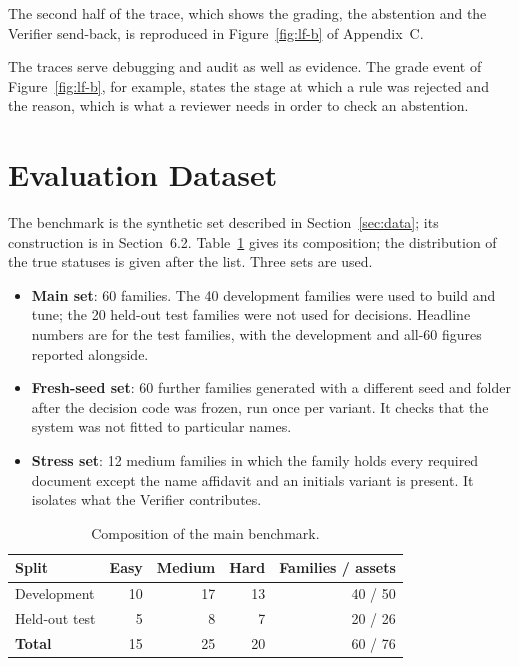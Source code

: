 \documentclass[12pt,a4paper,oneside]{report}
\begin{document}
The second half of the trace, which shows the grading, the abstention and the Verifier send-back, is reproduced in Figure~\ref{fig:lf-b} of Appendix~C.


The traces serve debugging and audit as well as evidence. The grade event of Figure~\ref{fig:lf-b}, for example, states the stage at which a rule was rejected and the reason, which is what a reviewer needs in order to check an abstention.

\section{Evaluation Dataset}\label{sec:dataset}
The benchmark is the synthetic set described in Section~\ref{sec:data}; its construction is in Section~6.2. Table~\ref{tab:dataset} gives its composition; the distribution of the true statuses is given after the list. Three sets are used.

\begin{itemize}[leftmargin=*,itemsep=2pt]
\item \textbf{Main set}: 60 families. The 40 development families were used to build and tune; the 20 held-out test families were not used for decisions. Headline numbers are for the test families, with the development and all-60 figures reported alongside.
\item \textbf{Fresh-seed set}: 60 further families generated with a different seed and folder after the decision code was frozen, run once per variant. It checks that the system was not fitted to particular names.
\item \textbf{Stress set}: 12 medium families in which the family holds every required document except the name affidavit and an initials variant is present. It isolates what the Verifier contributes.
\end{itemize}

\begin{table}[H]
\centering\small{}
\caption{Composition of the main benchmark.}\label{tab:dataset}
\renewcommand{\arraystretch}{1.1}
\begin{tabular}{@{}lrrrr@{}}
\toprule
\textbf{Split} & \textbf{Easy} & \textbf{Medium} & \textbf{Hard} & \textbf{Families / assets} \\ \midrule
Development & 10 & 17 & 13 & 40 / 50 \\
Held-out test & 5 & 8 & 7 & 20 / 26 \\
\textbf{Total} & 15 & 25 & 20 & 60 / 76 \\ \bottomrule
\end{tabular}
\end{table}
\end{document}
